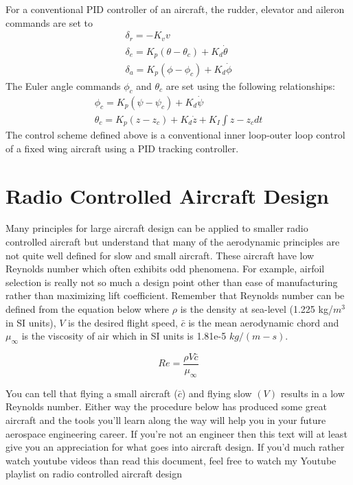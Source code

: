 \documentclass{article}
\def\beq{\begin{equation}}
\def\eeq{\end{equation}}
\begin{document}
For a conventional PID controller of an aircraft, the rudder, elevator
and aileron commands are set to 
\begin{equation}
\begin{matrix}
\delta_{r} =-K_v v \\
\delta_{e} = K_p(\theta-\theta_{c})+K_d{\dot \theta} \\ 
\delta_a = K_p(\phi-\phi_{c})+K_d{\dot \phi}
\end{matrix}
\end{equation}
The Euler angle commands $\phi_{c}$ and $\theta_{c}$ are set using the
following relationships:
\begin{equation}
  \begin{matrix}
  \phi_{c} = K_p(\psi-\psi_c)+K_d\dot{\psi} \\
  \theta_{c} = K_p(z-z_c) + K_d\dot{z} + K_{I}\int{z-z_c}dt
  \end{matrix}
\end{equation}
The control scheme defined above is a conventional inner loop-outer
loop control of a fixed wing aircraft using a PID tracking
controller.

\section{Radio Controlled Aircraft Design}

Many principles for large aircraft design can be applied to smaller
radio controlled aircraft but understand that many of the aerodynamic
principles are not quite well defined for slow and small
aircraft. These aircraft have low Reynolds number which often exhibits
odd phenomena. For example, airfoil selection is really not so much a
design point other than ease of manufacturing rather than maximizing
lift coefficient. Remember that Reynolds number can be defined from
the equation below where $\rho$ is the density at sea-level (1.225
kg/$m^3$ in SI units), $V$ is
the desired flight speed, $\bar{c}$ is the mean aerodynamic chord and
$\mu_{\infty}$ is the viscosity of air which in SI units is 1.81e-5
$kg/(m-s)$. 

\beq
Re = \frac{\rho V \bar{c}}{\mu_{\infty}}
\eeq

You can tell that flying a small aircraft ($\bar{c}$) and flying slow
$(V)$ results in a low Reynolds number. Either way the procedure below
has produced some great aircraft and the tools you'll learn along the
way will help you in your future aerospace engineering career. If
you're not an engineer then this text will at least give you an
appreciation for what goes into aircraft design. If you'd much rather
watch youtube videos than read this document, feel free to watch my
Youtube playlist on radio controlled aircraft design\cite{RCYoutube}
\end{document}
